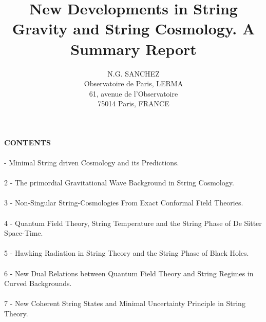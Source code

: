 \documentclass[12pt,a4paper]{article}
\begin{document}
\sloppy
\title{New Developments in String Gravity and String Cosmology. A Summary 
Report}
\author{N.G. SANCHEZ\\
Observatoire de Paris, LERMA\\61, avenue de l'Observatoire\\75014 Paris, 
FRANCE}
\date{ }
\maketitle

\noindent
{\bf CONTENTS}\\ \\
 - Minimal String driven Cosmology and its Predictions.\\ \\ 
2 - The primordial Gravitational Wave Background in String Cosmology. \\ \\
3 - Non-Singular String-Cosmologies From Exact Conformal Field Theories. \\ \\
4 - Quantum Field Theory, String Temperature and the String Phase of De 
Sitter Space-Time. \\ \\
5 - Hawking Radiation in String Theory and the String Phase of Black Holes.\\ 
\\
6 - New Dual Relations between Quantum Field Theory and  String Regimes in 
Curved Backgrounds.\\ \\
7 - New Coherent String States and Minimal Uncertainty Principle in 
String Theory. \\ \\
\end{document}
